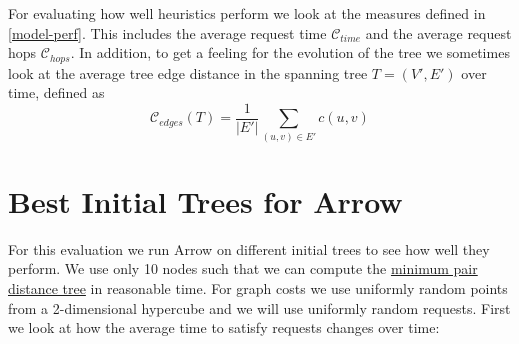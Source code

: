 \documentclass[a4paper, oneside]{discothesis}
\begin{document}
For evaluating how well heuristics perform we look at the measures defined in \autoref{model-perf}. This includes the average request time $\mathcal{C}_{time}$ and the average request hops $\mathcal{C}_{hops}$. In addition, to get a feeling for the evolution of the tree we sometimes look at the average tree edge distance in the spanning tree $T=(V',E')$ over time, defined as
\begin{equation}
\mathcal{C}_{edges}(T)=\frac{1}{|E'|}\sum_{(u,v)\in E'}c(u,v)
\end{equation}

\newcommand{\evalTime}{Average request time $\mathcal{C}_{time}$}
\newcommand{\evalHops}{Average request hops $\mathcal{C}_{hops}$}
\newcommand{\evalEdges}{Average tree edge distance $\mathcal{C}_{edges}$}


\newpage
\section{Best Initial Trees for Arrow}\label{result:trees}

For this evaluation we run Arrow on different initial trees to see how well they perform. We use only 10 nodes such that we can compute the \hyperref[tree:mpd]{minimum pair distance tree} in reasonable time. For graph costs we use uniformly random points from a 2-dimensional hypercube and we will use uniformly random requests. First we look at how the average time to satisfy requests changes over time:

\end{document}
